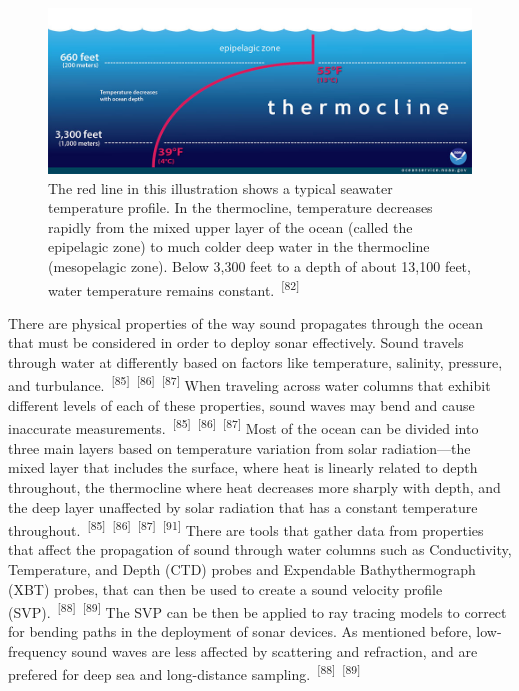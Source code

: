 \documentclass{article}
\begin{document}
\begin{figure}
    \centering
    \includegraphics[width=1.0\linewidth]{images/thermocline.jpg}
    \caption{The red line in this illustration shows a typical seawater temperature profile. In the thermocline, temperature decreases rapidly from the mixed upper layer of the ocean (called the epipelagic zone) to much colder deep water in the thermocline (mesopelagic zone). Below 3,300 feet to a depth of about 13,100 feet, water temperature remains constant.~\textsuperscript{[82]}}
    \label{figure24}
\end{figure}


\par{There are physical properties of the way sound propagates through the ocean that must be considered in order to deploy sonar effectively. Sound travels through water at differently based on factors like temperature, salinity, pressure, and turbulance.~\textsuperscript{[85]}~\textsuperscript{[86]}~\textsuperscript{[87]} When traveling across water columns that exhibit different levels of each of these properties, sound waves may bend and cause inaccurate measurements.~\textsuperscript{[85]}~\textsuperscript{[86]}~\textsuperscript{[87]}  Most of the ocean can be divided into three main layers based on temperature variation from solar radiation---the mixed layer that includes the surface, where heat is linearly related to depth throughout, the thermocline where heat decreases more sharply with depth, and the deep layer unaffected by solar radiation that has a constant temperature throughout.~\textsuperscript{[85]}~\textsuperscript{[86]}~\textsuperscript{[87]}~\textsuperscript{[91]}  There are tools that gather data from properties that affect the propagation of sound through water columns such as Conductivity, Temperature, and Depth (CTD) probes and Expendable Bathythermograph (XBT) probes, that can then be used to create a sound velocity profile (SVP).~\textsuperscript{[88]}~\textsuperscript{[89]} The SVP can be then be applied to ray tracing models to correct for bending paths in the deployment of sonar devices. As mentioned before, low-frequency sound waves are less affected by scattering and refraction, and are prefered for deep sea and long-distance sampling.~\textsuperscript{[88]}~\textsuperscript{[89]}}
\end{document}

